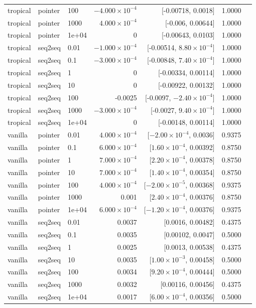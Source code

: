 \documentclass[10pt]{article}
\begin{document}
{\begin{longtable}{lllrrrl}
tropical & pointer & 100 & $-4.000\times10^{-4}$ & [-0.00718, 0.0018] & 1.0000 & \\
tropical & pointer & 1000 & $4.000\times10^{-4}$ & [-0.006, 0.00644] & 1.0000 & \\
tropical & pointer & 1e+04 & 0 & [-0.00643, 0.0103] & 1.0000 & \\
tropical & seq2seq & 0.01 & $-1.000\times10^{-4}$ & [-0.00514, $8.80\times10^{-4}$] & 1.0000 & \\
tropical & seq2seq & 0.1 & $-3.000\times10^{-4}$ & [-0.00848, $7.40\times10^{-4}$] & 1.0000 & \\
tropical & seq2seq & 1 & 0 & [-0.00334, 0.00114] & 1.0000 & \\
tropical & seq2seq & 10 & 0 & [-0.00922, 0.00132] & 1.0000 & \\
tropical & seq2seq & 100 & -0.0025 & [-0.0097, $-2.40\times10^{-4}$] & 1.0000 & \\
tropical & seq2seq & 1000 & $-3.000\times10^{-4}$ & [-0.0027, $9.40\times10^{-4}$] & 1.0000 & \\
tropical & seq2seq & 1e+04 & 0 & [-0.00148, 0.00114] & 1.0000 & \\
vanilla & pointer & 0.01 & $4.000\times10^{-4}$ & [$-2.00\times10^{-4}$, 0.0036] & 0.9375 & \\
vanilla & pointer & 0.1 & $6.000\times10^{-4}$ & [$1.60\times10^{-4}$, 0.00392] & 0.8750 & \\
vanilla & pointer & 1 & $7.000\times10^{-4}$ & [$2.20\times10^{-4}$, 0.00378] & 0.8750 & \\
vanilla & pointer & 10 & $7.000\times10^{-4}$ & [$1.40\times10^{-4}$, 0.00354] & 0.8750 & \\
vanilla & pointer & 100 & $4.000\times10^{-4}$ & [$-2.00\times10^{-5}$, 0.00368] & 0.9375 & \\
vanilla & pointer & 1000 & 0.001 & [$2.40\times10^{-4}$, 0.00376] & 0.8750 & \\
vanilla & pointer & 1e+04 & $6.000\times10^{-4}$ & [$-1.20\times10^{-4}$, 0.00376] & 0.9375 & \\
vanilla & seq2seq & 0.01 & 0.0037 & [0.0016, 0.00482] & 0.4375 & \\
vanilla & seq2seq & 0.1 & 0.0035 & [0.00102, 0.0047] & 0.5000 & \\
vanilla & seq2seq & 1 & 0.0025 & [0.0013, 0.00538] & 0.4375 & \\
vanilla & seq2seq & 10 & 0.0035 & [$1.00\times10^{-3}$, 0.00458] & 0.5000 & \\
vanilla & seq2seq & 100 & 0.0034 & [$9.20\times10^{-4}$, 0.00444] & 0.5000 & \\
vanilla & seq2seq & 1000 & 0.0032 & [0.00116, 0.00456] & 0.4375 & \\
vanilla & seq2seq & 1e+04 & 0.0017 & [$6.00\times10^{-4}$, 0.00356] & 0.5000 & \\
\bottomrule
\end{longtable}
}
\end{document}
